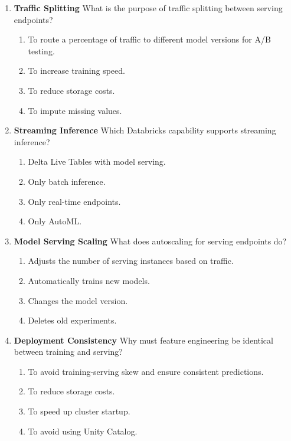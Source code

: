 \documentclass{article}
\begin{document}
\begin{enumerate}[label=\textbf{Q\arabic*.}]
		\item \textbf{Traffic Splitting}
		What is the purpose of traffic splitting between serving endpoints?
		\begin{enumerate}[label=\Alph*.]
			\item To route a percentage of traffic to different model versions for A/B testing.
			\item To increase training speed.
			\item To reduce storage costs.
			\item To impute missing values.
		\end{enumerate}
		
		\item \textbf{Streaming Inference}
		Which Databricks capability supports streaming inference?
		\begin{enumerate}[label=\Alph*.]
			\item Delta Live Tables with model serving.
			\item Only batch inference.
			\item Only real-time endpoints.
			\item Only AutoML.
		\end{enumerate}
		
		\item \textbf{Model Serving Scaling}
		What does autoscaling for serving endpoints do?
		\begin{enumerate}[label=\Alph*.]
			\item Adjusts the number of serving instances based on traffic.
			\item Automatically trains new models.
			\item Changes the model version.
			\item Deletes old experiments.
		\end{enumerate}
		
		\item \textbf{Deployment Consistency}
		Why must feature engineering be identical between training and serving?
		\begin{enumerate}[label=\Alph*.]
			\item To avoid training-serving skew and ensure consistent predictions.
			\item To reduce storage costs.
			\item To speed up cluster startup.
			\item To avoid using Unity Catalog.
		\end{enumerate}
		

\end{enumerate}
\end{document}
